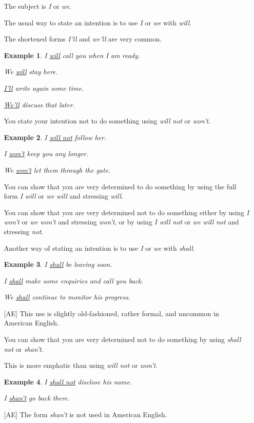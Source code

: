 \documentclass[oneside]{book}
\numberwithin{equation}{section}
\newtheorem{example}{Example}[section]
\begin{document}
The subject is \textit{I} or \textit{we}.

%
\noindent{} The usual way to state an intention is to use \textit{I} or \textit{we} with \textit{will}.

The shortened forms \textit{I'll} and \textit{we'll} are very common.
\begin{example}
    I \underline{will} call you when I am ready.
    
    We \underline{will} stay here.
    
    \underline{I'll} write again some time.
    
    \underline{We'll} discuss that later.
\end{example}
You state your intention not to do something using \textit{will not} or \textit{won't}.
\begin{example}
    I \underline{will not} follow her.
    
    I \underline{won't} keep you any longer.
    
    We \underline{won't} let them through the gate.
\end{example}
%
\noindent{} You can show that you are very determined to do something by using the full form \textit{I will} or \textit{we will} and stressing \textit{will}.

%
You can show that you are very determined not to do something either by using \textit{I won't} or \textit{we won't} and stressing \textit{won't}, or by using \textit{I will not} or \textit{we will not} and stressing \textit{not}.

%
\noindent{} Another way of stating an intention is to use \textit{I} or \textit{we} with \textit{shall}.
\begin{example}
    I \underline{shall} be leaving soon.
    
    I \underline{shall} make some enquiries and call you back.
    
    We \underline{shall} continue to monitor his progress.
\end{example}
[AE] This use is slightly old-fashioned, rather formal, and uncommon in American English.

%
You can show that you are very determined not to do something by using \textit{shall not} or \textit{shan't}.

This is more emphatic than using \textit{will not} or \textit{won't}.
\begin{example}
    I \underline{shall not} disclose his name.
    
    I \underline{shan't} go back there.
\end{example}
[AE] The form \textit{shan't} is not used in American English.
\end{document}
